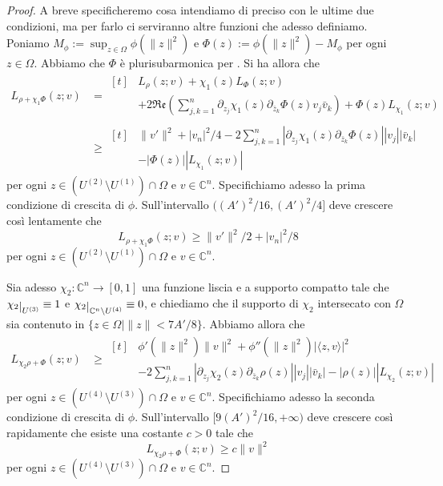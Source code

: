 \begin{proof}
    A breve specificheremo cosa intendiamo di preciso con le ultime due condizioni, ma per farlo ci serviranno altre funzioni che adesso definiamo. Poniamo $M_\phi:=\displaystyle\sup_{z\in\Omega}\phi(\|z\|^2)$ e $\Phi(z):=\phi(\|z\|^2)-M_\phi$ per ogni $z\in\Omega$. Abbiamo che $\Phi$ è plurisubarmonica per \cite[Proposition 2.2.6]{Kr}. Si ha allora che
    \begin{align*}
        L_{\rho+\chi_1\Phi}(z;v)&=\begin{aligned}[t]&L_\rho(z;v)+\chi_1(z)L_\Phi(z;v)\\
        &+2\mathfrak{Re}\left(\sum_{j,k=1}^n\partial_{z_j}\chi_1(z)\partial_{\bar{z}_k}\Phi(z)v_j\bar{v}_k\right)+\Phi(z)L_{\chi_1}(z;v)\end{aligned}\\
        &\ge\begin{aligned}[t]&\|v'\|^2+|v_n|^2/4-2\sum_{j,k=1}^n|\partial_{z_j}\chi_1(z)\partial_{\bar{z}_k}\Phi(z)||v_j||\bar{v}_k|\\
        &-|\Phi(z)||L_{\chi_1}(z;v)|\end{aligned}
    \end{align*}
    per ogni $z\in(U^{(2)}\setminus U^{(1)})\cap\Omega$ e $v\in\mathbb{C}^n$. Specifichiamo adesso la prima condizione di crescita di $\phi$. Sull'intervallo $((A')^2/16,(A')^2/4]$ deve crescere così lentamente che
    $$L_{\rho+\chi_1\Phi}(z;v)\ge \|v'\|^2/2+|v_n|^2/8$$
    per ogni $z\in(U^{(2)}\setminus U^{(1)})\cap\Omega$ e $v\in\mathbb{C}^n$.

    Sia adesso $\chi_2:\mathbb{C}^n\longrightarrow[0,1]$ una funzione liscia e a supporto compatto tale che $\chi_2\restrict{U^{(3)}}\equiv1$ e $\chi_2\restrict{\mathbb{C}^n\setminus{U^{(4)}}}\equiv 0$, e chiediamo che il supporto di $\chi_2$ intersecato con $\Omega$ sia contenuto in $\{z\in\Omega\mid \|z\|<7A'/8\}$. Abbiamo allora che
    \begin{align*}
        L_{\chi_2\rho+\Phi}(z;v)&\ge\begin{aligned}[t]&\phi'(\|z\|^2)\|v\|^2+\phi''(\|z\|^2)|\langle z,v\rangle|^2\\
        &-2\sum_{j,k=1}^n|\partial_{z_j}\chi_2(z)\partial_{\bar{z}_k}\rho(z)||v_j||\bar{v}_k|-|\rho(z)||L_{\chi_2}(z;v)|\end{aligned}
    \end{align*}
    per ogni $z\in(U^{(4)}\setminus U^{(3)})\cap\Omega$ e $v\in\mathbb{C}^n$. Specifichiamo adesso la seconda condizione di crescita di $\phi$. Sull'intervallo $[9(A')^2/16,+\infty)$ deve crescere così rapidamente che esiste una costante $c>0$ tale che
    $$L_{\chi_2\rho+\Phi}(z;v)\ge c\|v\|^2$$
    per ogni $z\in(U^{(4)}\setminus U^{(3)})\cap\Omega$ e $v\in\mathbb{C}^n$.


\end{proof}
